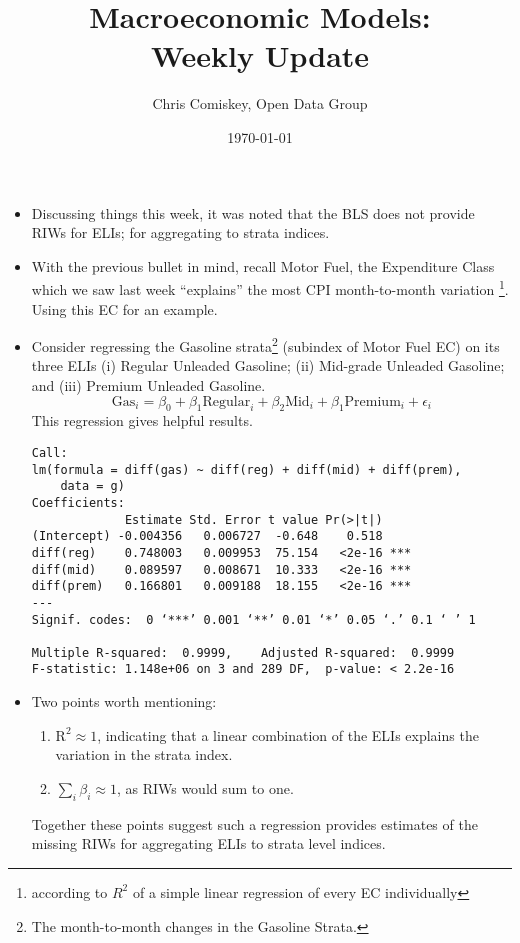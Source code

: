\documentclass{article}
\title{Macroeconomic Models: \\ Weekly Update}
\author{Chris Comiskey, Open Data Group}
\date{\today}
\begin{document}
\maketitle{}

\begin{itemize}
\item Discussing things this week, it was noted that the BLS does not provide RIWs for ELIs; for aggregating to strata indices.
\item With the previous bullet in mind, recall Motor Fuel, the Expenditure Class which we saw last week ``explains'' the most CPI month-to-month variation \footnote{according to $R^{2}$ of a simple linear regression of every EC individually}. Using this EC for an example.
\item Consider regressing the Gasoline strata\footnote{The month-to-month changes in the Gasoline Strata.} (subindex of Motor Fuel EC) on its three ELIs (i) Regular Unleaded Gasoline; (ii) Mid-grade Unleaded Gasoline; and (iii) Premium Unleaded Gasoline.
$$ \text{Gas}_{i} = \beta_{0} + \beta_{1}\text{Regular}_{i} + \beta_{2}\text{Mid}_{i} + \beta_{1}\text{Premium}_{i} + \epsilon_{i} $$
This regression gives helpful results.
\begin{verbatim}
Call:
lm(formula = diff(gas) ~ diff(reg) + diff(mid) + diff(prem), 
    data = g)
Coefficients:
             Estimate Std. Error t value Pr(>|t|)    
(Intercept) -0.004356   0.006727  -0.648    0.518    
diff(reg)    0.748003   0.009953  75.154   <2e-16 ***
diff(mid)    0.089597   0.008671  10.333   <2e-16 ***
diff(prem)   0.166801   0.009188  18.155   <2e-16 ***
---
Signif. codes:  0 ‘***’ 0.001 ‘**’ 0.01 ‘*’ 0.05 ‘.’ 0.1 ‘ ’ 1

Multiple R-squared:  0.9999,	Adjusted R-squared:  0.9999 
F-statistic: 1.148e+06 on 3 and 289 DF,  p-value: < 2.2e-16
\end{verbatim}
\item Two points worth mentioning:
  \begin{enumerate}
  \item $\text{R}^{2} \approx 1$, indicating that a linear combination of the ELIs explains the variation in the strata index. 
  \item $\sum_{i} \beta_{i} \approx 1$, as RIWs would sum to one. 
  \end{enumerate}
Together these points suggest such a regression provides estimates of the missing RIWs for aggregating ELIs to strata level indices.
\end{itemize}
\end{document}
